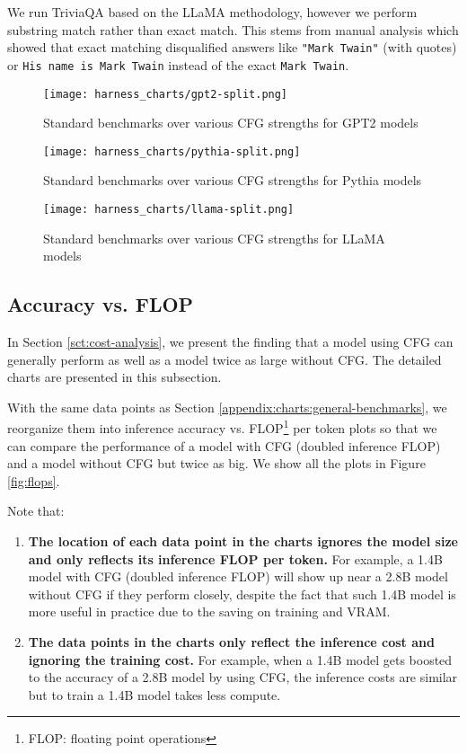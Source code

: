\documentclass{article}
\begin{document}
We run TriviaQA based on the LLaMA \cite{llama} methodology, however we perform substring match rather than exact match. This stems from manual analysis which showed that exact matching disqualified answers like \texttt{"Mark Twain"} (with quotes) or \texttt{His name is Mark Twain} instead of the exact \texttt{Mark Twain}.

\begin{figure}
    \centering
    \texttt{[image: harness\_charts/gpt2-split.png]}
    \caption{Standard benchmarks over various CFG strengths for GPT2 models}
    \label{fig:gpt2-split}
\end{figure}

\begin{figure}
    \centering
    \texttt{[image: harness\_charts/pythia-split.png]}
    \caption{Standard benchmarks over various CFG strengths for Pythia models}
    \label{fig:pythia-split}
\end{figure}

\begin{figure}
    \centering
    \texttt{[image: harness\_charts/llama-split.png]}
    \caption{Standard benchmarks over various CFG strengths for LLaMA models}
    \label{fig:llama-split}
\end{figure}


\subsection{Accuracy vs. FLOP}
\label{app:flops}
In Section \ref{sct:cost-analysis}, we present the finding that a model using CFG can generally perform as well as a model twice as large without CFG. The detailed charts are presented in this subsection.

With the same data points as Section \ref{appendix:charts:general-benchmarks}, we reorganize them into inference accuracy vs. FLOP\footnote{FLOP: floating point operations} per token plots so that we can compare the performance of a model with CFG (doubled inference FLOP) and a model without CFG but twice as big. We show all the plots in Figure \ref{fig:flops}.

Note that:
\begin{enumerate}
    \item \textbf{The location of each data point in the charts ignores the model size and only reflects its inference FLOP per token.} For example, a 1.4B model with CFG (doubled inference FLOP) will show up near a 2.8B model without CFG if they perform closely, despite the fact that such 1.4B model is more useful in practice due to the saving on training and VRAM.
    \item \textbf{The data points in the charts only reflect the inference cost and ignoring the training cost.} For example, when a 1.4B model gets boosted to the accuracy of a 2.8B model by using CFG, the inference costs are similar but to train a 1.4B model takes less compute.
\end{enumerate}
\end{document}
